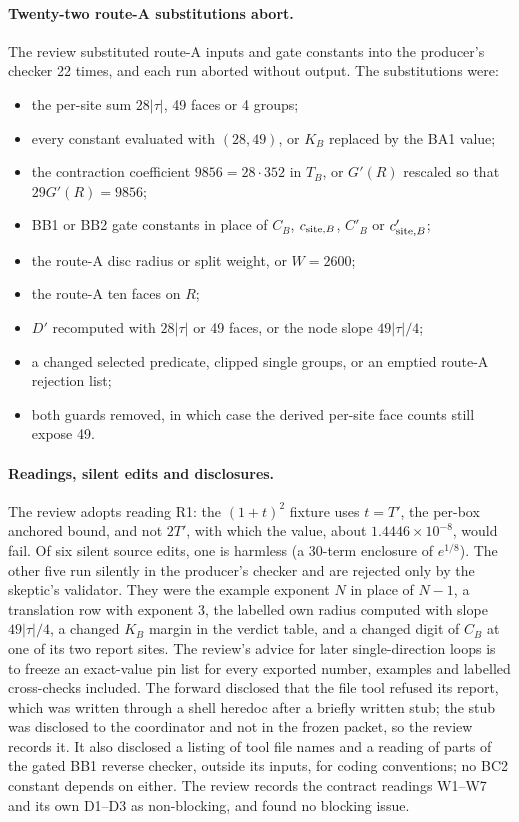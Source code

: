 \paragraph{Twenty-two route-A substitutions abort.} The review substituted
route-A inputs and gate constants into the producer's checker 22 times, and
each run aborted without output. The substitutions were:
\begin{itemize}
\item the per-site sum $28|\tau|$, 49 faces or 4 groups;
\item every constant evaluated with $(28,49)$, or $K_B$ replaced by the BA1
 value;
\item the contraction coefficient $9856=28\cdot352$ in $T_B$, or $G'(R)$
 rescaled so that $29G'(R)=9856$;
\item BB1 or BB2 gate constants in place of $C_B$, $c_{{\rm site},B}$,
 $C'_B$ or $c'_{{\rm site},B}$;
\item the route-A disc radius or split weight, or $W=2600$;
\item the route-A ten faces on $R$;
\item $D'$ recomputed with $28|\tau|$ or 49 faces, or the node slope
 $49|\tau|/4$;
\item a changed selected predicate, clipped single groups, or an emptied
 route-A rejection list;
\item both guards removed, in which case the derived per-site face counts
 still expose 49.
\end{itemize}

\paragraph{Readings, silent edits and disclosures.} The review adopts
reading R1: the $(1+t)^2$ fixture uses $t=T'$, the per-box anchored bound, and
not $2T'$, with which the value, about $1.4446\times10^{-8}$, would fail. Of
six silent source edits, one is harmless (a 30-term enclosure of $e^{1/8}$).
The other five run silently in the producer's checker and are rejected only
by the skeptic's validator. They were the example exponent $N$ in place of
$N-1$, a translation row with exponent 3, the labelled own radius computed
with slope $49|\tau|/4$, a changed $K_B$ margin in the verdict table, and a
changed digit of $C_B$ at one of its two report sites. The review's advice
for later single-direction loops is to freeze an exact-value pin list for
every exported number, examples and labelled cross-checks included. The
forward disclosed that the file tool refused its report, which was written
through a shell heredoc after a briefly written stub; the stub was disclosed
to the coordinator and not in the frozen packet, so the review records it. It
also disclosed a listing of tool file names and a reading of parts of the
gated BB1 reverse checker, outside its inputs, for coding conventions; no BC2
constant depends on either. The review records the contract readings W1--W7
and its own D1--D3 as non-blocking, and found no blocking issue.

